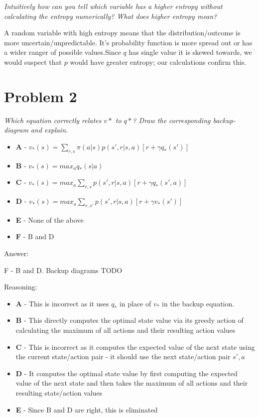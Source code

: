 \documentclass{article}
\begin{document}
\textit{Intuitively how can you tell which variable has a higher entropy without calculating the entropy numerically? What does higher entropy mean?}

A random variable with high entropy means that the distribution/outcome is more uncertain/unpredictable. It's probability function is more spread out or has a wider ranger of possible values.Since $q$ has single value it is skewed towards, we would suspect that $p$ would have greater entropy; our calculations confirm this.


\section*{Problem 2}

\textit{Which equation correctly relates $v*$ to $q*$? Draw the corresponding backup-diagram and explain.}

\begin{itemize}
    \item \textbf{A} - $v_*(s) = \sum_{r,s} \pi(a|s)p(s', r|s,a)[r+\gamma q_* (s')]$
    \item \textbf{B} - $v_*(s) = max_a q_*(s|a)$
    \item \textbf{C} - $v_*(s)= max_a \sum_{r,s} p(s', r|s,a)[r+\gamma q_*(s',a)]$
    \item \textbf{D} - $v_*(s) = max_a \sum_{r,s'} p(s',r|s, a)[r+\gamma v_*(s')] $
    \item \textbf{E} - None of the above
    \item \textbf{F} - B and D
\end{itemize}

Answer:

F - B and D. Backup diagrams TODO

Reasoning:

\begin{itemize}
    \item \textbf{A} - This is incorrect as it uses $q_*$ in place of $v_*$ in the backup equation.
    \item \textbf{B} - This directly computes the optimal state value via its greedy action of calculating the maximum of all actions and their resulting action values
    \item \textbf{C} - This is incorrect as it computes the expected value of the next state using the current state/action pair - it should use the next state/action pair $s',a$
    \item \textbf{D} - It computes the optimal state value by first computing the expected value of the next state and then takes the maximum of all actions and their resulting state/action values
    \item \textbf{E} - Since B and D are right, this is eliminated
\end{itemize}
\end{document}
